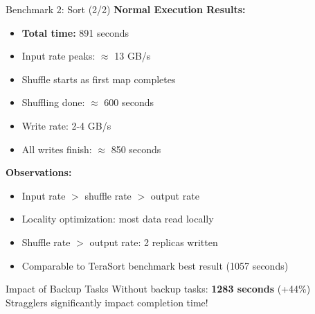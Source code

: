 \documentclass[aspectratio=169]{beamer}
\begin{document}
\begin{frame}{Benchmark 2: Sort (2/2)}
\textbf{Normal Execution Results:}
\begin{itemize}
    \item \textbf{Total time:} 891 seconds
    \item Input rate peaks: $\approx$ 13 GB/s
    \item Shuffle starts as first map completes
    \item Shuffling done: $\approx$ 600 seconds
    \item Write rate: 2-4 GB/s
    \item All writes finish: $\approx$ 850 seconds
\end{itemize}

\vspace{0.3cm}

\textbf{Observations:}
\begin{itemize}
    \item Input rate $>$ shuffle rate $>$ output rate
    \item Locality optimization: most data read locally
    \item Shuffle rate $>$ output rate: 2 replicas written
    \item Comparable to TeraSort benchmark best result (1057 seconds)
\end{itemize}

\vspace{0.3cm}

\begin{block}{Impact of Backup Tasks}
Without backup tasks: \textbf{1283 seconds} (+44\%) \\
Stragglers significantly impact completion time!
\end{block}
\end{frame}
\end{document}
